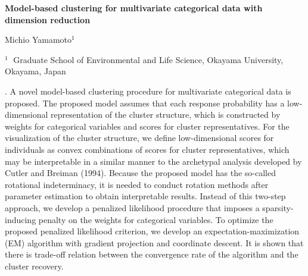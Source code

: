 \documentclass[12pt]{article}
\begin{document}
\begin{flushleft}


{\LARGE\bf Model-based clustering for multivariate categorical data with
 dimension reduction}


\vspace{1.0cm}

Michio Yamamoto$^1$

\begin{description}

\item $^1 \;$ Graduate School of Environmental and Life Science, Okayama
						University,
Okayama, Japan


\end{description}

\end{flushleft}


\vspace{0.75cm}

. A novel model-based clustering procedure for
multivariate categorical data is proposed. The proposed model assumes
that each response probability has a low-dimensional representation of
the cluster structure, which is constructed by weights for categorical
variables and scores for cluster representatives. For the visualization
of the cluster structure, we define low-dimensional scores for
individuals as convex combinations of scores for cluster
representatives, which may be interpretable in a similar manner to the
archetypal analysis developed by Cutler and Breiman (1994). Because the
proposed model has the so-called rotational indeterminacy, it is needed
to conduct rotation methods after parameter estimation to obtain
interpretable results. Instead of this two-step approach, we develop a
penalized likelihood procedure that imposes a sparsity-inducing penalty
on the weights for categorical variables. To optimize the proposed
penalized likelihood criterion, we develop an expectation-maximization
(EM) algorithm with gradient projection and coordinate descent. It is
shown that there is trade-off relation between the convergence rate of
the algorithm and the cluster recovery.
\end{document}
